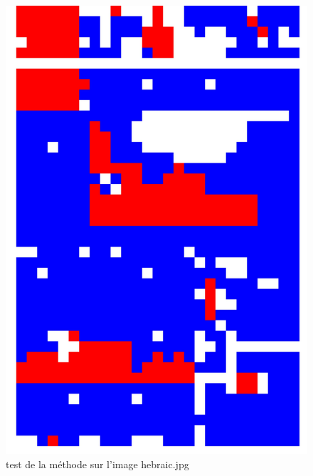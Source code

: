 \documentclass{book}
\begin{document}
\begin{figure}[H]
\begin{center}
\includegraphics[scale=0.05]{../test/hebraic_res_hog_hsv_kmeans.jpg}
\end{center}
\caption{test de la méthode sur l'image hebraic.jpg}
\label{test2}
\end{figure}
\end{document}

